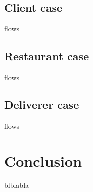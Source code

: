 \documentclass[a4paper]{report}
\begin{document}
	\section{Client case} flows
	\section{Restaurant case} flows
	\section{Deliverer case} flows

\newpage
\chapter*{Conclusion}
blblabla

\newpage
\begin{thebibliography}{300}
\end{thebibliography}
\end{document}
